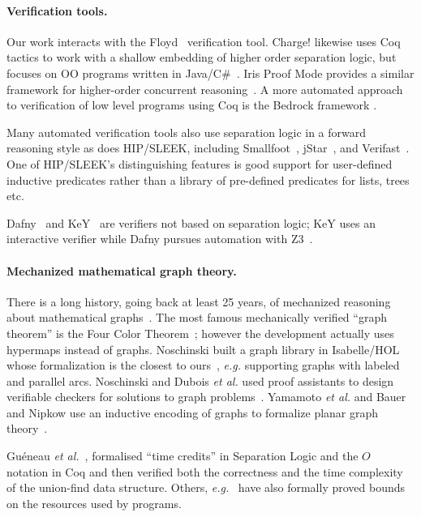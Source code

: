 \vspace{-1ex}
\paragraph{Verification tools.}
Our work interacts with the Floyd~\cite{appel:programlogics} verification
tool.  Charge! likewise uses Coq tactics to work with a shallow embedding of higher
order separation logic, but focuses on OO programs written in
Java/C\#~\cite{bengtson:charge}.  Iris Proof Mode provides a similar framework for higher-order
concurrent reasoning~\cite{krebbers:iris}.  A  more automated approach to verification of low
level programs using Coq is the Bedrock framework \cite{chlipala:bedrock}.

Many automated verification tools also use separation logic in a forward reasoning style
as does HIP/SLEEK, including Smallfoot~\cite{berdine:smallfoot},
jStar~\cite{distefanop08}, and Verifast~\cite{jacobs:verifast}.  One of HIP/SLEEK's
distinguishing features is good support for user-defined inductive predicates rather
than a library of pre-defined predicates for lists, trees etc.

Dafny~\cite{leino10} and KeY~\cite{beckert:2007} are verifiers not based
on separation logic; KeY uses an interactive verifier while Dafny pursues automation with Z3~\cite{moura2008}.

\vspace{-1ex}
\paragraph{Mechanized mathematical graph theory.} There is a long history,
going back at least 25 years, of mechanized reasoning about mathematical
graphs~\cite{wong1991}.  The most famous mechanically verified ``graph theorem''
is the Four Color Theorem~\cite{gonthier2005computer}; however
the development actually uses hypermaps instead of graphs.
Noschinski built a graph library in Isabelle/HOL whose formalization
is the closest to ours~\cite{noschinski2015}, \emph{e.g.} supporting
graphs with labeled and parallel arcs.
Noschinski and Dubois \emph{et al.} used proof assistants to design verifiable
checkers for solutions to graph problems~\cite{noschinski2015formalizing,dubois2015graphes}.
Yamamoto \emph{et al.} and Bauer and Nipkow use an inductive
encoding of graphs to formalize planar graph theory~\cite{yamamoto1995formalization,bauer20025}.

Guéneau \emph{et al.}~\cite{gueneauetal},
formalised ``time credits'' in Separation Logic and the $O$ notation in
Coq and then verified both the correctness
and the time complexity of the union-find data structure. 
Others, \emph{e.g.}~\cite{others2, others4, others3, others1}
have also formally proved bounds on the resources
used by programs. %


